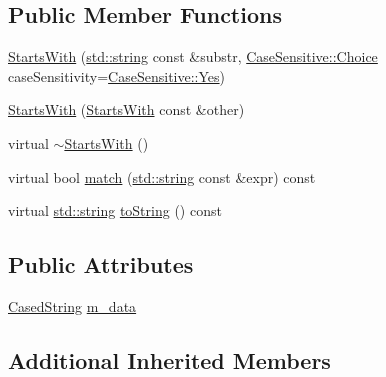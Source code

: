 \subsection*{Public Member Functions}
\begin{DoxyCompactItemize}
\item 
\hyperlink{struct_catch_1_1_matchers_1_1_impl_1_1_std_string_1_1_starts_with_a0db1bd8876219464ae60346c9525bcf6}{Starts\+With} (\hyperlink{_s_d_l__opengl__glext_8h_ae84541b4f3d8e1ea24ec0f466a8c568b}{std\+::string} const \&substr, \hyperlink{struct_catch_1_1_case_sensitive_aad49d3aee2d97066642fffa919685c6a}{Case\+Sensitive\+::\+Choice} case\+Sensitivity=\hyperlink{struct_catch_1_1_case_sensitive_aad49d3aee2d97066642fffa919685c6aa7c5550b69ec3c502e6f609b67f9613c6}{Case\+Sensitive\+::\+Yes})
\item 
\hyperlink{struct_catch_1_1_matchers_1_1_impl_1_1_std_string_1_1_starts_with_a5526cb587632e7e46253d6f60ae01098}{Starts\+With} (\hyperlink{struct_catch_1_1_matchers_1_1_impl_1_1_std_string_1_1_starts_with}{Starts\+With} const \&other)
\item 
virtual \hyperlink{struct_catch_1_1_matchers_1_1_impl_1_1_std_string_1_1_starts_with_ad22a0d01b6c29bd4784ffff988e99992}{$\sim$\+Starts\+With} ()
\item 
virtual bool \hyperlink{struct_catch_1_1_matchers_1_1_impl_1_1_std_string_1_1_starts_with_ae9c893adbacc853171a488aea5355653}{match} (\hyperlink{_s_d_l__opengl__glext_8h_ae84541b4f3d8e1ea24ec0f466a8c568b}{std\+::string} const \&expr) const 
\item 
virtual \hyperlink{_s_d_l__opengl__glext_8h_ae84541b4f3d8e1ea24ec0f466a8c568b}{std\+::string} \hyperlink{struct_catch_1_1_matchers_1_1_impl_1_1_std_string_1_1_starts_with_a066fe10e74495cb556abc6895193ba97}{to\+String} () const 
\end{DoxyCompactItemize}
\subsection*{Public Attributes}
\begin{DoxyCompactItemize}
\item 
\hyperlink{struct_catch_1_1_matchers_1_1_impl_1_1_std_string_1_1_cased_string}{Cased\+String} \hyperlink{struct_catch_1_1_matchers_1_1_impl_1_1_std_string_1_1_starts_with_accaace83106244c635d251addb028125}{m\+\_\+data}
\end{DoxyCompactItemize}
\subsection*{Additional Inherited Members}


